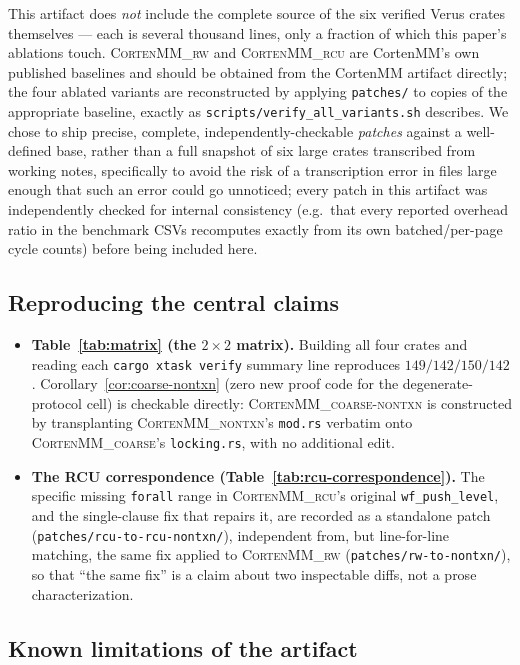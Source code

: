 \documentclass[10pt]{article}
\newcommand{\corten}[1]{\textsc{CortenMM\_#1}}
\newcommand{\vfn}[1]{\texttt{#1}}
\begin{document}
This artifact does \emph{not} include the complete source of the six
verified Verus crates themselves --- each is several thousand lines,
only a fraction of which this paper's ablations touch. \corten{rw}
and \corten{rcu} are CortenMM's own published baselines and should be
obtained from the CortenMM artifact directly; the four ablated
variants are reconstructed by applying \vfn{patches/} to copies of the
appropriate baseline, exactly as \vfn{scripts/verify\_all\_variants.sh}
describes. We chose to ship precise, complete, independently-checkable
\emph{patches} against a well-defined base, rather than a full
snapshot of six large crates transcribed from working notes,
specifically to avoid the risk of a transcription error in files large
enough that such an error could go unnoticed; every patch in this
artifact was independently checked for internal consistency (e.g.\ that
every reported overhead ratio in the benchmark CSVs recomputes exactly
from its own batched/per-page cycle counts) before being included here.

\subsection{Reproducing the central claims}

\begin{itemize}
  \item \textbf{Table~\ref{tab:matrix} (the $2{\times}2$ matrix).}
    Building all four crates and reading each \texttt{cargo xtask
    verify} summary line reproduces $149/142/150/142$.
    Corollary~\ref{cor:coarse-nontxn} (zero new proof code for the
    degenerate-protocol cell) is checkable directly: \corten{coarse-nontxn}
    is constructed by transplanting \corten{nontxn}'s \vfn{mod.rs}
    verbatim onto \corten{coarse}'s \vfn{locking.rs}, with no
    additional edit.
  \item \textbf{The RCU correspondence (Table~\ref{tab:rcu-correspondence}).}
    The specific missing \vfn{forall} range in \corten{rcu}'s original
    \vfn{wf\_push\_level}, and the single-clause fix that repairs it,
    are recorded as a standalone patch
    (\vfn{patches/rcu-to-rcu-nontxn/}), independent from, but
    line-for-line matching, the same fix applied to \corten{rw}
    (\vfn{patches/rw-to-nontxn/}), so that ``the same fix'' is a claim
    about two inspectable diffs, not a prose characterization.
\end{itemize}

\subsection{Known limitations of the artifact}
\end{document}
